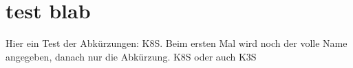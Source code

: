 \blindtext[2]\cite{bentley:1999}
\section{test blab}
Hier ein Test der Abkürzungen: \ac{K8S}. Beim ersten Mal wird noch der volle Name angegeben, danach nur die Abkürzung. \ac{K8S} oder auch \ac{K3S}